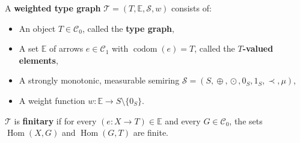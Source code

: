 \begin{definition}
    \label{def:weighted_type_graph}
    A \textbf{weighted type graph} \(\mathcal{T} \mathop{=} (T, \mathbb{E}, \mathcal{S}, w)\) consists of:
    \begin{itemize}
        \item An object \(T \mathop{\in} \mathcal{C}_0\), called the \textbf{type graph},
        \item A set \(\mathbb{E}\) of arrows \(e \mathop{\in} \mathcal{C}_1\) with \(\operatorname{codom}(e) \mathop{=} T\), called the \textbf{\(T\)-valued elements}, 
        \item A strongly monotonic, measurable semiring \(\mathcal{S}=(S, \mathop{\oplus}, \mathop{\odot}, 0_S, 1_S, \prec, \mu)\),
        \item A weight function \(w : \mathbb{E} \mathop{\to} S \mathop{\setminus} \{0_S\}\).
    \end{itemize}
    \(\mathcal{T}\) is \textbf{finitary} if for every \((e:X \mathop{\to} T) \mathop{\in} \mathbb{E}\) and every \(G \mathop{\in} \mathcal{C}_0\), the sets \(\operatorname{Hom}(X, G)\) and \(\operatorname{Hom}(G, T)\) are finite.
\end{definition}